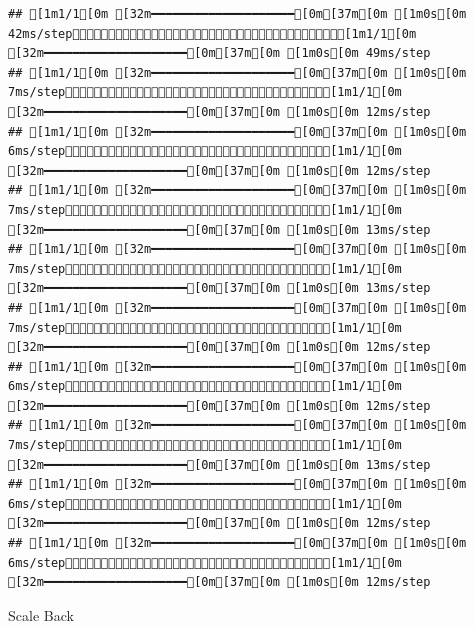 \documentclass[
]{article}
\begin{document}
\begin{verbatim}
## [1m1/1[0m [32m━━━━━━━━━━━━━━━━━━━━[0m[37m[0m [1m0s[0m 42ms/step[1m1/1[0m [32m━━━━━━━━━━━━━━━━━━━━[0m[37m[0m [1m0s[0m 49ms/step
## [1m1/1[0m [32m━━━━━━━━━━━━━━━━━━━━[0m[37m[0m [1m0s[0m 7ms/step[1m1/1[0m [32m━━━━━━━━━━━━━━━━━━━━[0m[37m[0m [1m0s[0m 12ms/step
## [1m1/1[0m [32m━━━━━━━━━━━━━━━━━━━━[0m[37m[0m [1m0s[0m 6ms/step[1m1/1[0m [32m━━━━━━━━━━━━━━━━━━━━[0m[37m[0m [1m0s[0m 12ms/step
## [1m1/1[0m [32m━━━━━━━━━━━━━━━━━━━━[0m[37m[0m [1m0s[0m 7ms/step[1m1/1[0m [32m━━━━━━━━━━━━━━━━━━━━[0m[37m[0m [1m0s[0m 13ms/step
## [1m1/1[0m [32m━━━━━━━━━━━━━━━━━━━━[0m[37m[0m [1m0s[0m 7ms/step[1m1/1[0m [32m━━━━━━━━━━━━━━━━━━━━[0m[37m[0m [1m0s[0m 13ms/step
## [1m1/1[0m [32m━━━━━━━━━━━━━━━━━━━━[0m[37m[0m [1m0s[0m 7ms/step[1m1/1[0m [32m━━━━━━━━━━━━━━━━━━━━[0m[37m[0m [1m0s[0m 12ms/step
## [1m1/1[0m [32m━━━━━━━━━━━━━━━━━━━━[0m[37m[0m [1m0s[0m 6ms/step[1m1/1[0m [32m━━━━━━━━━━━━━━━━━━━━[0m[37m[0m [1m0s[0m 12ms/step
## [1m1/1[0m [32m━━━━━━━━━━━━━━━━━━━━[0m[37m[0m [1m0s[0m 7ms/step[1m1/1[0m [32m━━━━━━━━━━━━━━━━━━━━[0m[37m[0m [1m0s[0m 13ms/step
## [1m1/1[0m [32m━━━━━━━━━━━━━━━━━━━━[0m[37m[0m [1m0s[0m 6ms/step[1m1/1[0m [32m━━━━━━━━━━━━━━━━━━━━[0m[37m[0m [1m0s[0m 12ms/step
## [1m1/1[0m [32m━━━━━━━━━━━━━━━━━━━━[0m[37m[0m [1m0s[0m 6ms/step[1m1/1[0m [32m━━━━━━━━━━━━━━━━━━━━[0m[37m[0m [1m0s[0m 12ms/step
\end{verbatim}

Scale Back
\end{document}
